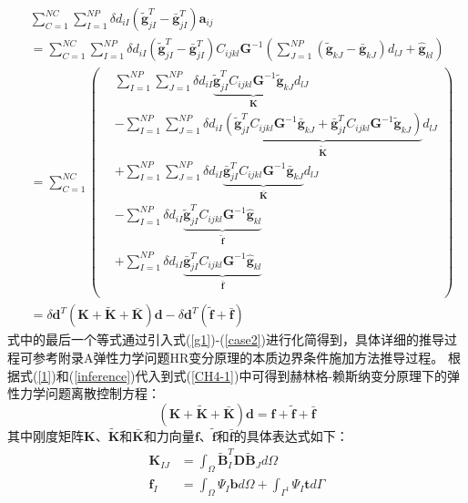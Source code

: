 \begin{equation}\label{inference}
\begin{split}
    &\sum_{C=1}^{N\!C}\sum_{I=1}^{N\!P}\delta d_{iI}(\tilde{\pmb g}_{jI}^T-\bar{\pmb g}_{jI}^T)\pmb{a}_{ij}\\
    &=\sum_{C=1}^{N\!C}\sum_{I=1}^{N\!P}\delta d_{iI}(\tilde{\pmb g}_{jI}^T-\bar{\pmb g}_{jI}^T)C_{ijkl}\pmb{G}^{-1}(\sum_{J=1}^{N\!P}(\tilde{\pmb g}_{kJ}-\bar{\pmb g}_{kJ})d_{lJ}+\hat{\pmb g}_{kl})\\
    &=\sum_{C=1}^{N\!C}
    \left(\begin{split}
    &\sum_{I=1}^{N\!P}\sum_{J=1}^{N\!P}\delta d_{iI}\underbrace{\tilde{\pmb g}^T_{jI}C_{ijkl}\pmb{G}^{-1}\tilde{\pmb g}_{kJ}}_{\pmb{K}}d_{lJ}\\
    &-\sum_{I=1}^{N\!P}\sum_{J=1}^{N\!P}\delta d_{iI}\underbrace{(\tilde{\pmb g}^T_{jI}C_{ijkl}\pmb{G}^{-1}\bar{\pmb g}_{kJ}
    +\bar{\pmb g}^T_{jI}C_{ijkl}\pmb{G}^{-1}\tilde{\pmb g}_{kJ})}_{\tilde{\pmb K}}d_{lJ}\\
    &+\sum_{I=1}^{N\!P}\sum_{J=1}^{N\!P}\delta d_{iI}\underbrace{\bar{\pmb g}^T_{jI}C_{ijkl}\pmb{G}^{-1}\bar{\pmb g}_{kJ}}_{\bar{\pmb K}}d_{lJ}\\
    &-\sum_{I=1}^{N\!P}\delta d_{iI}\underbrace{\tilde{\pmb g}_{jI}^TC_{ijkl}\pmb{G}^{-1}\hat{\pmb g}_{kl}}_{\tilde{\pmb f}}\\
    &+\sum_{I=1}^{N\!P}\delta d_{iI}\underbrace{\bar{\pmb g}_{jI}^TC_{ijkl}\pmb{G}^{-1}\hat{\pmb g}_{kl}}_{\bar{\pmb f}}\\
    \end{split}
    \right)\\
    &=\delta\pmb{d}^T(\pmb K+\tilde{\pmb K}+\bar{\pmb K})\pmb{d}-\delta\pmb{d}^T(\tilde{\pmb f}+\bar{\pmb f})
\end{split}
\end{equation}
式中的最后一个等式通过引入式(\ref{g1})-(\ref{case2})进行化简得到，具体详细的推导过程可参考附录A弹性力学问题HR变分原理的本质边界条件施加方法推导过程。
根据式(\ref{1})和(\ref{inference})代入到式(\ref{CH4-1})中可得到赫林格-赖斯纳变分原理下的弹性力学问题离散控制方程：
\begin{equation}\label{equationE}
    (\pmb{K}+\pmb{\tilde{K}}+\pmb{\bar{K}})\pmb{d}=\pmb{f}+\tilde{\pmb{f}}+\bar{\pmb{f}}
\end{equation}
其中刚度矩阵$\pmb K$、$\tilde{\pmb K}$和$\bar{\pmb K}$和力向量$\pmb f$、$\tilde{\pmb f}$和$\bar{\pmb f}$的具体表达式如下：
\begin{subequations}\label{Ehr1}
\begin{align}    
    \label{Ehr11}   \pmb{K}_{IJ}&=\int_{\Omega}\tilde{\pmb{B}}_I^T\pmb{D}\tilde{\pmb{B}}_Jd\Omega\\
    \label{Ehr12}   \pmb f_I&=\int_{\Omega}\Psi_I\pmb{b}d\Omega+\int_{\Gamma^t}\Psi_I\pmb{t}d\Gamma
\end{align}
\end{subequations}
